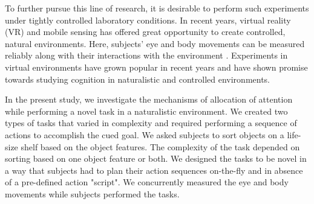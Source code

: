 To further pursue this line of research, it is desirable to perform such experiments under tightly controlled laboratory conditions. In recent years, virtual reality (VR) and mobile sensing has offered great opportunity to create controlled, natural environments. Here, subjects’ eye and body movements can be measured reliably along with their interactions with the environment \citep{Keshava2020-cp, Clay2019-cu, Mann2019-ls, Keshava2021-ei}. Experiments in virtual environments have grown popular in recent years and have shown promise towards studying cognition in naturalistic and controlled environments.

In the present study, we investigate the mechanisms of allocation of attention while performing a novel task in a naturalistic environment. We created two types of tasks that varied in complexity and required performing a sequence of actions to accomplish the cued goal. We asked subjects to sort objects on a life-size shelf based on the object features. The complexity of the task depended on sorting based on one object feature or both. We designed the tasks to be novel in a way that subjects had to plan their action sequences on-the-fly and in absence of a pre-defined action "script". We concurrently measured the eye and body movements while subjects performed the tasks.
